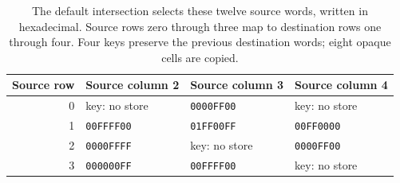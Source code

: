 \begin{table}[htbp]
  \centering
  \small
  \begin{tabular}{rlll}
    \toprule
    Source row & Source column 2   & Source column 3   & Source column 4   \\
    \midrule
    0          & key: no store     & \texttt{0000FF00} & key: no store     \\
    1          & \texttt{00FFFF00} & \texttt{01FF00FF} & \texttt{00FF0000} \\
    2          & \texttt{0000FFFF} & key: no store     & \texttt{0000FF00} \\
    3          & \texttt{000000FF} & \texttt{00FFFF00} & key: no store     \\
    \bottomrule
  \end{tabular}
  \caption{The default intersection selects these twelve source words, written in hexadecimal. Source rows zero through three map to destination rows one through four. Four keys preserve the previous destination words; eight opaque cells are copied.}
  \label{tab:revision-clipped-cells}
\end{table}
